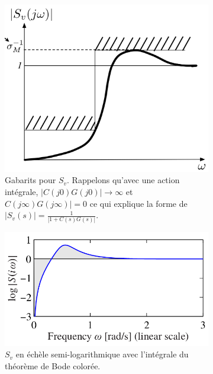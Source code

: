 \begin{figure}
  \begin{subfigure}{0.3\linewidth}
    \includegraphics[width=\linewidth]{sensitivity.png}
    \caption{Gabarits pour $S_v$.
    Rappelons qu'avec une action intégrale,
    $|C(j0)G(j0)| \to \infty$ et $C(j\infty)G(j\infty)| = 0$
    ce qui explique la forme de $|S_v(s)| = \frac{1}{|1+C(s)G(s)|}$.}
    \label{fig:sensitivity}
  \end{subfigure}
  \begin{subfigure}{0.3\linewidth}
    \includegraphics[width=\linewidth]{sensitivity-log.png}
    \caption{$S_v$ en échèle semi-logarithmique avec
    l'intégrale du théorème de Bode colorée\cite{astrom2010feedback}.}
    \label{fig:sensitivity-log}
  \end{subfigure}
  \begin{subfigure}{0.3\linewidth}

\end{subfigure}
\end{figure}
